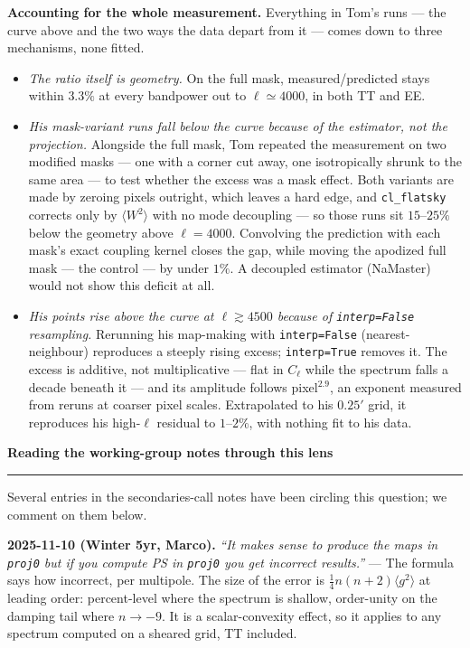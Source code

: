 \documentclass[10pt]{article}
\newcommand{\proj}[1]{\texttt{#1}}
\begin{document}
\vspace{2pt}
\textbf{Accounting for the whole measurement.}
Everything in Tom's runs --- the curve above and the two ways the data depart from it --- comes down to three mechanisms, none fitted.
\begin{itemize}
\item \emph{The ratio itself is geometry.}
On the full mask, measured/predicted stays within $3.3\%$ at every bandpower out to $\ell\simeq4000$, in both TT and EE.
\item \emph{His mask-variant runs fall below the curve because of the estimator, not the projection.}
Alongside the full mask, Tom repeated the measurement on two modified masks --- one with a corner cut away, one isotropically shrunk to the same area --- to test whether the excess was a mask effect.
Both variants are made by zeroing pixels outright, which leaves a hard edge, and \proj{cl\_flatsky} corrects only by $\langle W^2\rangle$ with no mode decoupling --- so those runs sit $15$--$25\%$ below the geometry above $\ell=4000$.
Convolving the prediction with each mask's exact coupling kernel closes the gap, while moving the apodized full mask --- the control --- by under $1\%$.
A decoupled estimator (NaMaster) would not show this deficit at all.
\item \emph{His points rise above the curve at $\ell\gtrsim4500$ because of \proj{interp=False} resampling.}
Rerunning his map-making with \proj{interp=False} (nearest-neighbour) reproduces a steeply rising excess; \proj{interp=True} removes it.
The excess is additive, not multiplicative --- flat in $C_\ell$ while the spectrum falls a decade beneath it --- and its amplitude follows pixel$^{2.9}$, an exponent measured from reruns at coarser pixel scales.
Extrapolated to his $0.25'$ grid, it reproduces his high-$\ell$ residual to $1$--$2\%$, with nothing fit to his data.
\end{itemize}

\vspace{8pt}

{\large\bfseries Reading the working-group notes through this lens}

\vspace{2pt}\hrule\vspace{6pt}

Several entries in the secondaries-call notes have been circling this question; we comment on them below.

\vspace{2pt}
\textbf{2025-11-10 (Winter 5yr, Marco).}
\emph{``It makes sense to produce the maps in \proj{proj0} but if you compute PS in \proj{proj0} you get incorrect results.''}
--- The formula says how incorrect, per multipole.
The size of the error is $\tfrac{1}{4}n(n+2)\langle g^2\rangle$ at leading order: percent-level where the spectrum is shallow, order-unity on the damping tail where $n\to-9$.
It is a scalar-convexity effect, so it applies to any spectrum computed on a sheared grid, TT included.
\end{document}
